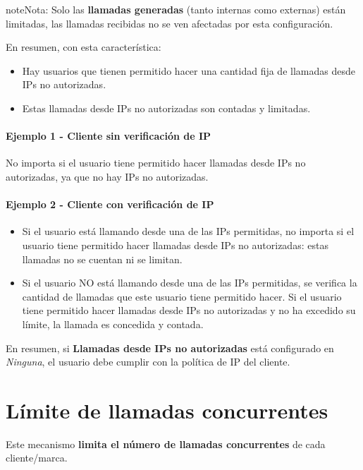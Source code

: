\documentclass[letterpaper,10pt,spanish]{sphinxmanual}
\begin{document}
\begin{notice}{note}{Nota:}
Solo las \textbf{llamadas generadas} (tanto internas como externas) están limitadas, las llamadas recibidas no se ven afectadas por esta configuración.
\end{notice}

En resumen, con esta característica:
\begin{itemize}
\item {} 
Hay usuarios que tienen permitido hacer una cantidad fija de llamadas desde IPs no autorizadas.

\item {} 
Estas llamadas desde IPs no autorizadas son contadas y limitadas.

\end{itemize}
\paragraph{Ejemplo 1 - Cliente sin verificación de IP}

No importa si el usuario tiene permitido hacer llamadas desde IPs no autorizadas, ya que no hay IPs no autorizadas.
\paragraph{Ejemplo 2 - Cliente con verificación de IP}
\begin{itemize}
\item {} 
Si el usuario está llamando desde una de las IPs permitidas, no importa si el usuario tiene permitido hacer llamadas desde IPs no autorizadas: estas llamadas no se cuentan ni se limitan.

\item {} 
Si el usuario NO está llamando desde una de las IPs permitidas, se verifica la cantidad de llamadas que este usuario tiene permitido hacer. Si el usuario tiene permitido hacer llamadas desde IPs no autorizadas y no ha excedido su límite, la llamada es concedida y contada.

\end{itemize}

En resumen, si \textbf{Llamadas desde IPs no autorizadas} está configurado en \emph{Ninguna}, el usuario debe cumplir con la política de IP del cliente.


\section{Límite de llamadas concurrentes}
\label{security_and_maintenance/security/concurrent_call_limit::doc}\label{security_and_maintenance/security/concurrent_call_limit:concurrent-call-limit}
Este mecanismo \textbf{limita el número de llamadas concurrentes} de cada cliente/marca.
\end{document}
